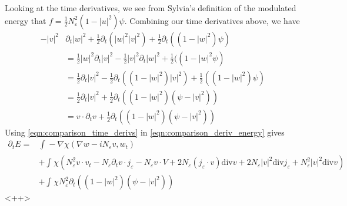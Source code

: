 \documentclass[a4paper]{article}
\renewcommand{\div}{\mathrm{div}}
\begin{document}
Looking at the time derivatives, we see from Sylvia's definition of the modulated energy that $f = \frac{1}{2} N_\varepsilon^2 ( 1 - |u|^2 ) \psi$.
Combining our time derivatives above, we have
\begin{align}
  - |v|^2 &\partial_t |w|^2 + \frac{1}{2}\partial_t ( |w|^2 |v|^2 ) + \frac{1}{2} \partial_t ( (1-|w|^2) \psi ) \nonumber \\
  &= \frac{1}{2} |w|^2 \partial_t |v|^2 - \frac{1}{2} |v|^2 \partial_t |w|^2 + \frac{1}{2} ( (1-|w|^2 \psi) \nonumber \\
  &= \frac{1}{2} \partial_t |v|^2 - \frac{1}{2} \partial_t ( (1-|w|^2)|v|^2) + \frac{1}{2} ( (1-|w|^2) \psi ) \nonumber \\
  &= \frac{1}{2} \partial_t |v|^2 + \frac{1}{2} \partial_t ( ( 1-|w|^2 ) ( \psi - |v|^2 ) ) \nonumber \\
  &= v \cdot \partial_t v + \frac{1}{2} \partial_t ( (1-|w|^2) ( \psi - |v|^2 ) )
  \label{eqn:comparison_time_derivs}
\end{align}
Using \eqref{eqn:comparison_time_derivs} in \eqref{eqn:comparison_deriv_energy} gives
\begin{align}
  \partial_t E = &\int_{}^{} -\nabla \chi ( \nabla w - i N_\varepsilon v, w_t) \nonumber \\
  &+ \int_{}^{} \chi \left( N_\varepsilon^2 v \cdot v_t - N_\varepsilon \partial_t v \cdot j_\varepsilon - N_\varepsilon v \cdot V + 2 N_\varepsilon
  (j_\varepsilon \cdot v) \div v + 2 N_\varepsilon |v|^2 \div j_\varepsilon + N_\varepsilon^2 |v|^2 \div v \right) \nonumber \\
  &+ \int_{}^{} \chi N_\varepsilon^2 \partial_t ( (1-|w|^2)(\psi-|v|^2) )
  \label{<++>}
\end{align}<++>
\end{document}
